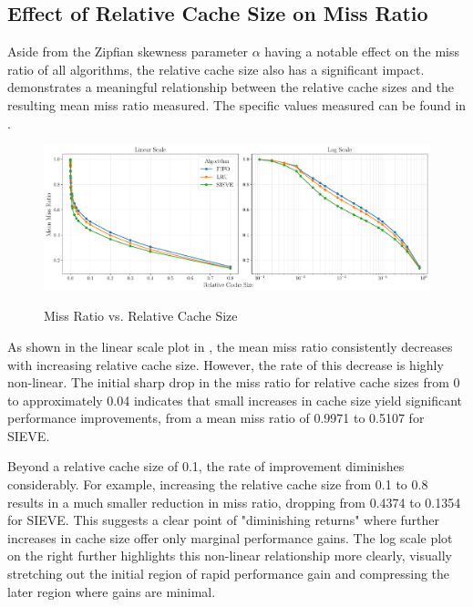 \subsection{Effect of Relative Cache Size on Miss Ratio}\label{results:miss-ratio-vs-relative-cache-size}


Aside from the Zipfian skewness parameter $\alpha$ having a notable effect on the miss ratio of all algorithms, the relative cache size also has a significant impact.  demonstrates a meaningful relationship between the relative cache sizes and the resulting mean miss ratio measured. The specific values measured can be found in .

\begin{figure}[h!]
    \centering
    \caption{Miss Ratio vs. Relative Cache Size}
    \includegraphics[width=\linewidth]{figures/simulations/miss_ratio_vs_cache_size_both.pdf}
    \label{fig:miss-ratio-cache-size}
\end{figure}

As shown in the linear scale plot in , the mean miss ratio consistently decreases with increasing relative cache size. However, the rate of this decrease is highly non-linear. The initial sharp drop in the miss ratio for relative cache sizes from 0 to approximately 0.04 indicates that small increases in cache size yield significant performance improvements, from a mean miss ratio of 0.9971 to 0.5107 for SIEVE.

Beyond a relative cache size of 0.1, the rate of improvement diminishes considerably. For example, increasing the relative cache size from 0.1 to 0.8 results in a much smaller reduction in miss ratio, dropping from 0.4374 to 0.1354 for SIEVE. This suggests a clear point of "diminishing returns" where further increases in cache size offer only marginal performance gains. The log scale plot on the right further highlights this non-linear relationship more clearly, visually stretching out the initial region of rapid performance gain and compressing the later region where gains are minimal.

